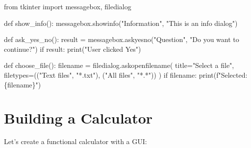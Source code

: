 \documentclass[
  letterpaper,
  DIV=11,
  numbers=noendperiod,
  oneside]{scrreprt}
\newenvironment{Shaded}{}{}
\newcommand{\BuiltInTok}[1]{\textcolor[rgb]{0.84,0.23,0.29}{#1}}
\newcommand{\ControlFlowTok}[1]{\textcolor[rgb]{0.84,0.23,0.29}{#1}}
\newcommand{\ImportTok}[1]{\textcolor[rgb]{0.01,0.18,0.38}{#1}}
\newcommand{\KeywordTok}[1]{\textcolor[rgb]{0.84,0.23,0.29}{#1}}
\newcommand{\NormalTok}[1]{\textcolor[rgb]{0.14,0.16,0.18}{#1}}
\newcommand{\OperatorTok}[1]{\textcolor[rgb]{0.14,0.16,0.18}{#1}}
\newcommand{\SpecialCharTok}[1]{\textcolor[rgb]{0.00,0.36,0.77}{#1}}
\newcommand{\SpecialStringTok}[1]{\textcolor[rgb]{0.01,0.18,0.38}{#1}}
\newcommand{\StringTok}[1]{\textcolor[rgb]{0.01,0.18,0.38}{#1}}
\begin{document}
\begin{Shaded}
\begin{Highlighting}[]
\ImportTok{from}\NormalTok{ tkinter }\ImportTok{import}\NormalTok{ messagebox, filedialog}

\KeywordTok{def}\NormalTok{ show\_info():}
\NormalTok{    messagebox.showinfo(}\StringTok{"Information"}\NormalTok{, }\StringTok{"This is an info dialog"}\NormalTok{)}

\KeywordTok{def}\NormalTok{ ask\_yes\_no():}
\NormalTok{    result }\OperatorTok{=}\NormalTok{ messagebox.askyesno(}\StringTok{"Question"}\NormalTok{, }\StringTok{"Do you want to continue?"}\NormalTok{)}
    \ControlFlowTok{if}\NormalTok{ result:}
        \BuiltInTok{print}\NormalTok{(}\StringTok{"User clicked Yes"}\NormalTok{)}

\KeywordTok{def}\NormalTok{ choose\_file():}
\NormalTok{    filename }\OperatorTok{=}\NormalTok{ filedialog.askopenfilename(}
\NormalTok{        title}\OperatorTok{=}\StringTok{"Select a file"}\NormalTok{,}
\NormalTok{        filetypes}\OperatorTok{=}\NormalTok{((}\StringTok{"Text files"}\NormalTok{, }\StringTok{"*.txt"}\NormalTok{), (}\StringTok{"All files"}\NormalTok{, }\StringTok{"*.*"}\NormalTok{))}
\NormalTok{    )}
    \ControlFlowTok{if}\NormalTok{ filename:}
        \BuiltInTok{print}\NormalTok{(}\SpecialStringTok{f"Selected: }\SpecialCharTok{\{}\NormalTok{filename}\SpecialCharTok{\}}\SpecialStringTok{"}\NormalTok{)}
\end{Highlighting}
\end{Shaded}

\section{Building a Calculator}\label{building-a-calculator}

Let's create a functional calculator with a GUI:
\end{document}
